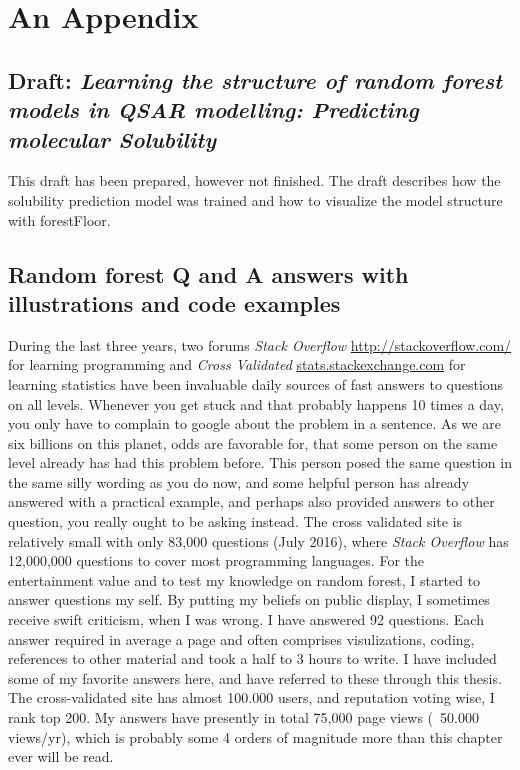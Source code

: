 \chapter{An Appendix}

\section{Draft: \textit{Learning the structure of random forest models in QSAR modelling: Predicting molecular Solubility}}
\label{article:solubility}

This draft has been prepared, however not finished. The draft describes how the solubility prediction model was trained and how to visualize the model structure with forestFloor.



\section{Random forest Q and A answers with illustrations and code examples}

During the last three years, two forums \textit{Stack Overflow} \url{http://stackoverflow.com/} for learning programming and \textit{Cross Validated} \url{stats.stackexchange.com} for learning statistics have been invaluable daily sources of fast answers to questions on all levels. Whenever you get stuck and that probably happens 10 times a day, you only have to complain to google about the problem in a sentence. As we are six billions on this planet, odds are favorable for, that some person on the same level already has had this problem before. This person posed the same question in the same silly wording as you do now, and some helpful person has already answered with a practical example, and perhaps also provided answers to other question, you really ought to be asking instead. The cross validated site is relatively small with only 83,000 questions (July 2016), where \textit{Stack Overflow} has 12,000,000 questions to cover most programming languages. For the entertainment value and to test my knowledge on random forest, I started to answer questions my self. By putting my beliefs on public display, I sometimes receive swift criticism, when I was wrong. I have answered 92 questions. Each answer required in average a page and often comprises visulizations, coding, references to other material and took a half to 3 hours to write. I have included some of my favorite answers here, and have referred to these through this thesis. The cross-validated site has almost 100.000 users, and reputation voting wise, I rank top 200. My answers have presently in total 75,000 page views (~50.000 views/yr), which is probably some 4 orders of magnitude more than this chapter ever will be read.


